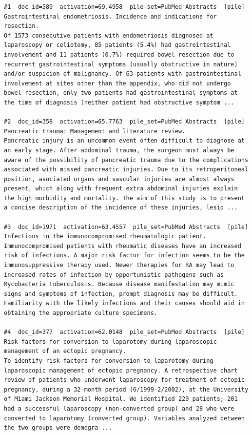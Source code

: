 \begin{verbatim}
#1  doc_id=580  activation=69.4958  pile_set=PubMed Abstracts  [pile]
Gastrointestinal endometriosis. Incidence and indications for resection.
Of 1573 consecutive patients with endometriosis diagnosed at laparoscopy or celiotomy, 85 patients (5.4%) had gastrointestinal involvement and 11 patients (0.7%) required bowel resection due to recurrent gastrointestinal symptoms (usually obstructive in nature) and/or suspicion of malignancy. Of 63 patients with gastrointestinal involvement at sites other than the appendix, who did not undergo bowel resection, only two patients had gastrointestinal symptoms at the time of diagnosis (neither patient had obstructive symptom ...

#2  doc_id=358  activation=65.7763  pile_set=PubMed Abstracts  [pile]
Pancreatic trauma: Management and literature review.
Pancreatic injury is an uncommon event often difficult to diagnose at an early stage. After abdominal trauma, the surgeon must always be aware of the possibility of pancreatic trauma due to the complications associated with missed pancreatic injuries. Due to its retroperitoneal position, asociated organs and vascular injuries are almost always present, which along with frequent extra abdominal injuries explain the high morbidity and mortality. The aim of this study is to present a concise description of the incidence of these injuries, lesio ...

#3  doc_id=1971  activation=63.4557  pile_set=PubMed Abstracts  [pile]
Infections in the immunocompromised rheumatologic patient.
Immunocompromised patients with rheumatic diseases have an increased risk of infections. A major risk factor for infection seems to be the immunosuppressive therapy used. Newer therapies for RA may lead to increased rates of infection by opportunistic pathogens such as Mycobacteria tuberculosis. Because disease manifestation may mimic signs and symptoms of infection, prompt diagnosis may be difficult. Familiarity with the likely infections and their causes should aid in obtaining the appropriate culture specimens.

#4  doc_id=377  activation=62.0148  pile_set=PubMed Abstracts  [pile]
Risk factors for conversion to laparotomy during laparoscopic management of an ectopic pregnancy.
To identify risk factors for conversion to laparotomy during laparoscopic management of ectopic pregnancy. A retrospective chart review of patients who underwent laparoscopy for treatment of ectopic pregnancy, during a 32-month period (6/1999-2/2002), at the University of Miami Jackson Memorial Hospital. We identified 229 patients; 201 had a successful laparoscopy (non-converted group) and 28 who were converted to laparotomy (converted group). Variables analyzed between the two groups were demogra ...


\end{verbatim}
